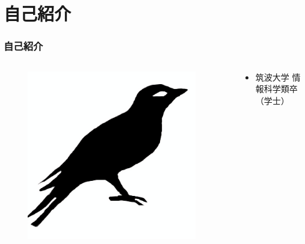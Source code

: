 



\newcommand\ballref[1]{%
\tikz \node[circle, shade,ball color=structure.fg,inner sep=0pt,%
  text width=8pt,font=\tiny,align=center] {\color{white}\ref{#1}};
}



\frame{\maketitle}

\section{自己紹介}
\begin{frame}
  \frametitle{自己紹介}
  
  \begin{columns}
    \begin{column}{0.3\textwidth}
      \centering
      \begin{figure}
        \includegraphics[width=0.95\textwidth]{img/bird2x.png}
      \end{figure}
    \end{column}
    \begin{column}{0.7\textwidth}
      \begin{itemize}
        \item<2-> 筑波大学 情報科学類卒（学士）
      \end{itemize}
    \end{column}
  \end{columns}
\end{frame}

